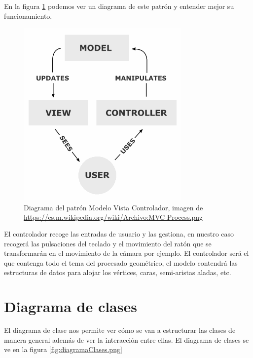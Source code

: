 En la figura \ref{fig:MVC-Process.png} podemos ver un diagrama de este patrón y entender mejor su funcionamiento. 

\begin{figure} %
	\centering
	\includegraphics[scale=0.5]{imagenes/MVC-Process.png} 
	\caption{ Diagrama del patrón Modelo Vista Controlador, imagen de \url{https://es.m.wikipedia.org/wiki/Archivo:MVC-Process.png} } \label{fig:MVC-Process.png}
\end{figure}

El controlador recoge las entradas de usuario y las gestiona, en nuestro caso recogerá las pulsaciones del teclado y el movimiento del ratón que se transformarán en el movimiento de la cámara por ejemplo. El controlador será el que contenga todo el tema del procesado geométrico, el modelo contendrá las estructuras de datos para alojar los vértices, caras, semi-aristas aladas, etc. \\

\newpage
\section{ Diagrama de clases}
El diagrama de clase nos permite ver cómo se van a estructurar las clases de manera general además de ver la interacción entre ellas. El diagrama de clases se ve en la figura \ref{fig:diagramaClases.png}

